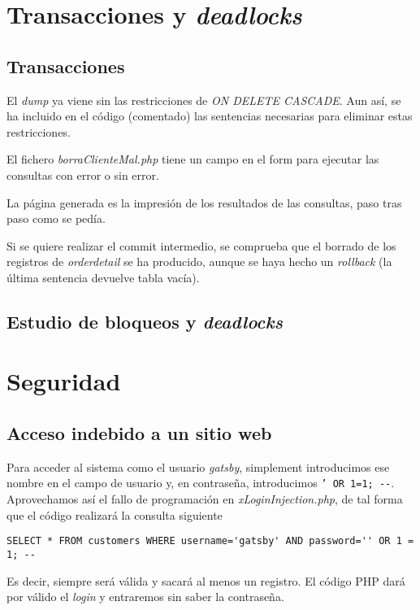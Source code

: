 \documentclass{article}
\begin{document}
\section{Transacciones y \textit{deadlocks}}

\subsection{Transacciones}

El \textit{dump} ya viene sin las restricciones de \textit{ON DELETE CASCADE}. Aun así, se ha incluido en el código (comentado) las sentencias necesarias para eliminar estas restricciones.

El fichero \textit{borraClienteMal.php} tiene un campo en el form para ejecutar las consultas con error o sin error. 

La página generada es la impresión de los resultados de las consultas, paso tras paso como se pedía. 

Si se quiere realizar el commit intermedio, se comprueba que el borrado de los registros de \textit{orderdetail} se ha producido, aunque se haya hecho un \textit{rollback} (la última sentencia devuelve tabla vacía).

\subsection{Estudio de bloqueos y \textit{deadlocks}}

\section{Seguridad}

\subsection{Acceso indebido a un sitio web}

Para acceder al sistema como el usuario \textit{gatsby}, simplement introducimos ese nombre en el campo de usuario y, en contraseña, introducimos \texttt{' OR 1=1; {-}-}. Aprovechamos así el fallo de programación en \textit{xLoginInjection.php}, de tal forma que el código realizará la consulta siguiente

\begin{Verbatim}[frame = lines]
SELECT * FROM customers WHERE username='gatsby' AND password='' OR 1 = 1; --
\end{Verbatim}

Es decir, siempre será válida y sacará al menos un registro. El código PHP dará por válido el \textit{login} y entraremos sin saber la contraseña.
\end{document}
